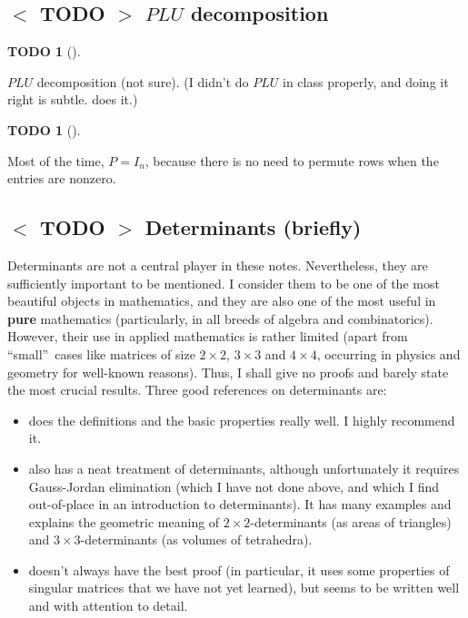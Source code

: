 \documentclass[numbers=enddot,12pt,final,onecolumn,notitlepage]{scrartcl}%
\theoremstyle{definition}
\newtheorem{quest}[theo]{TODO}
\newenvironment{todo}[1][]
{\begin{quest}[#1]\begin{leftbar}}
{\end{leftbar}\end{quest}}
\begin{document}
\subsection{%
$<$%
TODO%
$>$
$PLU$ decomposition}

\begin{todo}
$PLU$ decomposition (not sure). (I didn't do $PLU$ in class properly, and
doing it right is subtle. \cite[Example 1.12]{OlvSha06} does it.)
\end{todo}

\begin{todo}
Most of the time, $P=I_{n}$, because there is no need to permute rows when the
entries are nonzero.
\end{todo}

\subsection{%
$<$%
TODO%
$>$
Determinants (briefly)}

Determinants are not a central player in these notes. Nevertheless, they are
sufficiently important to be mentioned. I consider them to be one of the most
beautiful objects in mathematics, and they are also one of the most useful in
\textbf{pure} mathematics (particularly, in all breeds of algebra and
combinatorics). However, their use in applied mathematics is rather limited
(apart from \textquotedblleft small\textquotedblright\ cases like matrices of
size $2\times2$, $3\times3$ and $4\times4$, occurring in physics and geometry
for well-known reasons). Thus, I shall give no proofs and barely state the
most crucial results. Three good references on determinants are:

\begin{itemize}
\item \cite[Chapter 8]{LaNaSc16} does the definitions and the basic properties
really well. I highly recommend it.

\item \cite[Chapter Four]{Heffer16} also has a neat treatment of determinants,
although unfortunately it requires Gauss-Jordan elimination (which I have not
done above, and which I find out-of-place in an introduction to determinants).
It has many examples and explains the geometric meaning of $2\times
2$-determinants (as areas of triangles) and $3\times3$-determinants (as
volumes of tetrahedra).

\item \cite[Chapter 4]{BarSch73} doesn't always have the best proof (in
particular, it uses some properties of singular matrices that we have not yet
learned), but seems to be written well and with attention to detail.
\end{itemize}
\end{document}
